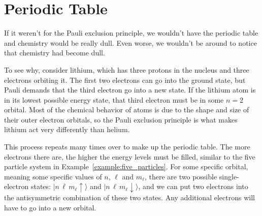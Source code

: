\section{Periodic Table}

If it weren't for the Pauli exclusion principle, we wouldn't have the
periodic table and chemistry would be really dull.  Even worse, we
wouldn't be around to notice that chemistry had become dull.

To see why, consider lithium, which has three protons in the nucleus
and three electrons orbiting it.  The first two electrons can go into
the ground state, but Pauli demands that the third electron go into a
new state.  If the lithium atom is in its lowest possible energy
state, that third electron must be in some $n=2$ orbital.  Most of the
chemical behavior of atoms is due to the shape and size of their outer
electron orbitals, so the Pauli exclusion principle is what makes
lithium act very differently than helium.

This process repeats many times over to make up the periodic table.
The more electrons there are, the higher the energy levels must be filled,
similar to the five particle system in Example~\ref{example:five_particles}.
For some specific orbital, meaning some specific values of $n$, $\ell$
and $m_\ell$, there are two possible single-electron states:
$|n\,\ell\,m_\ell\uparrow\rangle$ and
$|n\,\ell\,m_\ell\downarrow\rangle$, and we can put two electrons into
the antisymmetric combination of these two states.  Any additional
electrons will have to go into a new orbital.

